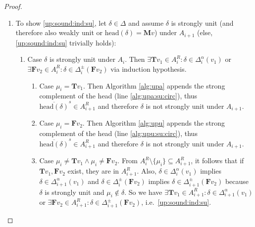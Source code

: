 \documentclass{vutinfth} %
\newcommand{\negstrong}[1]{\overline{#1}^s}
\newcommand{\ass}{A}
\newcommand{\bT}{\mathbf{T}}
\newcommand{\bM}{\mathbf{M}}
\newcommand{\bF}{\mathbf{F}}
\newcommand{\contradiction}{\Lightning}
\newcommand{\dpm}{\Delta^\pm}
\newcommand{\dal}{\Delta^\alpha}
\newcommand{\headf}{\mathrm{head}}
\newcommand{\sgl}{\mu}
\begin{document}
\begin{proof}
\begin{enumerate}
\item To show \ref{up:sound:ind:su}, let $\delta \in \Delta$ and assume $\delta$ is strongly unit (and therefore also weakly unit or $\headf(\delta) = \bM v$) under $\ass_{i+1}$ (else, \ref{up:sound:ind:su} trivially holds):
\begin{enumerate}
	\item Case $\delta$ is strongly unit under $\ass_i$. Then $\exists {\bT v_1} \in \ass_i^R : \delta \in \dal_i(v_1)$ or $\exists {\bF v_2} \in \ass_i^R : \delta \in \dpm_i({\bF v_2})$ via induction hypothesis.
	\begin{enumerate}
		\item Case $\sgl_i = {\bT v_1}$. Then Algorithm \ref{alg:upa} appends the strong complement of the head (line \ref{alg:upa:su:circ}), thus $\negstrong{\headf(\delta)} \in A_{i+1}^R$ and therefore $\delta$ is not strongly unit under $A_{i+1}$. \contradiction
		\item Case $\sgl_i = {\bF v_2}$. Then Algorithm \ref{alg:upu} appends the strong complement of the head (line \ref{alg:upu:su:circ}), thus $\negstrong{\headf(\delta)} \in A_{i+1}^R$ and therefore $\delta$ is not strongly unit under $A_{i+1}$. \contradiction
		\item Case $\sgl_i \not = {\bT v_1} \wedge \sgl_i \not = {\bF v_2}$.
		From $\ass_{i}^R \setminus \{ \sgl_i \} \subseteq \ass_{i+1}^R$, it follows that if ${\bT v_1}, {\bF v_2}$ exist, they are in $\ass_{i+1}^R$. Also, $\delta \in \dal_i(v_1)$ implies $\delta \in \dal_{i+1}(v_1)$ and $\delta \in \dpm_i({\bF v_2})$ implies $\delta \in \dpm_{i+1}({\bF v_2})$ because $\delta$ is strongly unit and $\sgl_i \not \in \delta$. So we have $\exists {\bT v_1} \in \ass_{i+1}^R : \delta \in \dal_{i+1}(v_1)$ or $\exists {\bF v_2} \in \ass_{i+1}^R : \delta \in \dpm_{i+1}({\bF v_2})$, i.e.~\ref{up:sound:ind:su}. %
	\end{enumerate}
	

\end{enumerate}
\end{enumerate}
\end{proof}
\end{document}
